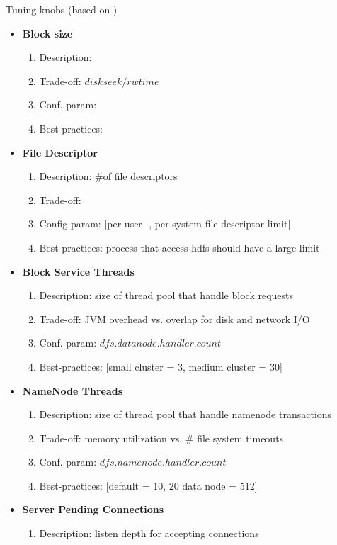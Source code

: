 	
	
	Tuning knobs (based on \cite{Venner2009})
	\begin{itemize}
		\item \textbf{Block size}
		\begin{enumerate}
			\item Description: 
			\item Trade-off: $disk seek / rw time$
			\item Conf. param: 
			\item Best-practices: 
		\end{enumerate}
		\item \textbf{File Descriptor}
		\begin{enumerate}
			\item Description: $\#$of file descriptors
			\item Trade-off: 
			\item Config param: [per-user -, per-system file descriptor limit]
			\item Best-practices: process that access hdfs should have a large limit
		\end{enumerate}
		\item \textbf{Block Service Threads}
		\begin{enumerate}
			\item Description: size of thread pool that handle block requests 			
			\item Trade-off: JVM overhead vs. overlap for disk and network I/O
			\item Conf. param: $dfs.datanode.handler.count$
			\item Best-practices: [small cluster = 3, medium cluster = 30]
		\end{enumerate}
		\item \textbf{NameNode Threads}
		\begin{enumerate}
			\item Description: size of thread pool that handle namenode transactions
			\item Trade-off: memory utilization vs. $\#$ file system timeouts
			\item Conf. param: $dfs.namenode.handler.count$
			\item Best-practices: [default = 10, 20 data node = 512]
		\end{enumerate}
		\item \textbf{Server Pending Connections}
		\begin{enumerate}
			\item Description: listen depth for accepting connections

\end{enumerate}
\end{itemize}
